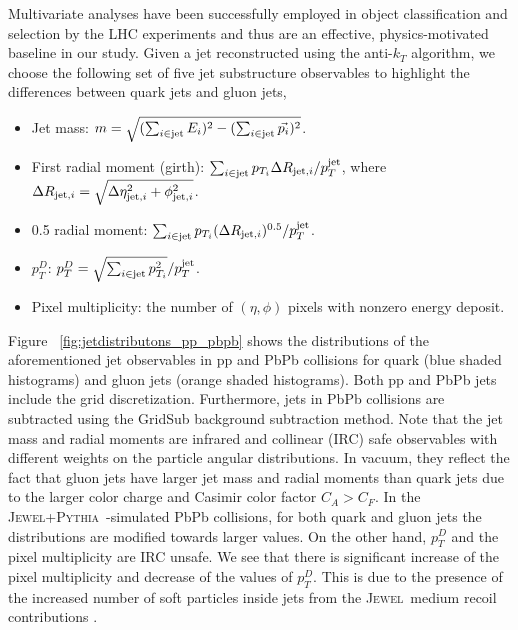 \documentclass[notoc]{JHEP3}
\newcommand{\jw}{\textsc{Jewel}~}
\newcommand{\jwpy}{\textsc{Jewel+Pythia}~}
\begin{document}
Multivariate analyses have been successfully employed in object classification and selection by the LHC experiments \cite{} and thus are an effective, physics-motivated baseline in our study. Given a jet reconstructed using the anti-$k_{T}$ algorithm, we choose the following set of five jet substructure observables \cite{Gallicchio:2012ez} to highlight the differences between quark jets and gluon jets,
	\begin{itemize}
		\item Jet mass: $m = \sqrt{(\sum_{i\in {\rm jet}} E_i)^{2} - (\sum_{i\in {\rm jet}} \vec{p_i})^2}$.
        \item First radial moment (girth): $\sum_{i \in {\rm jet}} p_{T_i} \Delta R_{{\rm jet}, i}/p^{\rm jet}_{T}$, where $\Delta R_{{\rm jet}, i}=\sqrt{\Delta \eta^2_{{\rm jet}, i}+\phi^2_{{\rm jet}, i}}$.
		\item 0.5 radial moment:  $\sum_{i \in {\rm jet}} p_{T_i} (\Delta R_{{\rm jet}, i})^{0.5}/p^{\rm jet}_{T}$.
        \item $p_{T}^{D}$: $p^{D}_{T} = \sqrt{\sum_{i \in {\rm jet}} {p^2_{T_i}}}/p^{\rm jet}_{T}$.
        \item Pixel multiplicity: the number of $(\eta,\phi)$ pixels with nonzero energy deposit. %
	\end{itemize}

Figure ~\ref{fig:jetdistributons_pp_pbpb} shows the distributions of the aforementioned jet observables in pp and PbPb collisions for quark (blue shaded histograms) and gluon jets (orange shaded histograms). Both pp and PbPb jets include the grid discretization. Furthermore, jets in PbPb collisions are subtracted using the GridSub background subtraction method. Note that the jet mass and radial moments are infrared and collinear (IRC) safe observables with different weights on the particle angular distributions. In vacuum, they reflect the fact that gluon jets have larger jet mass and radial moments than quark jets due to the larger color charge and Casimir color factor $C_A>C_F$. In the \jwpy-simulated PbPb collisions, for both quark and gluon jets the distributions are modified towards larger values. On the other hand, $p_T^D$ and the pixel multiplicity are IRC unsafe. We see that there is significant increase of the pixel multiplicity and decrease of the values of $p_T^D$. This is due to the presence of the increased number of soft particles inside jets from the \jw medium recoil contributions \cite{KunnawalkamElayavalli:2017hxo}.
\end{document}
